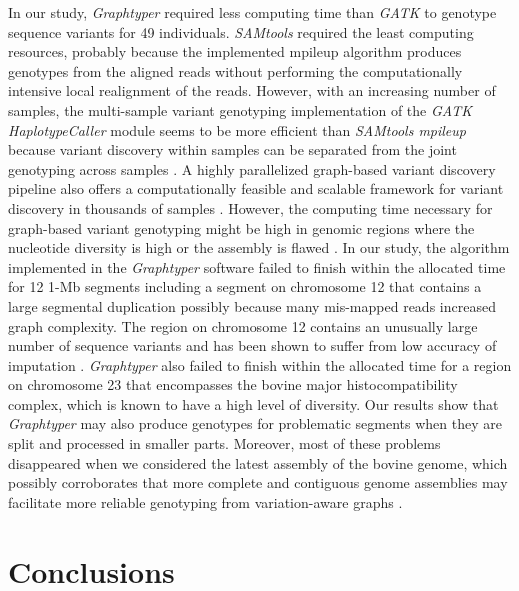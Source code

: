 \documentclass[../main.tex]{subfiles}
\begin{document}
In our study, \emph{Graphtyper} required less computing time than \emph{GATK} to genotype sequence variants for 49 individuals. \emph{SAMtools} required the least computing resources, probably because the implemented mpileup algorithm produces genotypes from the aligned reads without performing the computationally intensive local realignment of the reads. However, with an increasing number of samples, the multi-sample variant genotyping implementation of the \emph{GATK HaplotypeCaller} module seems to be more efficient than \emph{SAMtools mpileup} because variant discovery within samples can be separated from the joint genotyping across samples \citep{poplin2018scaling,vander2018best}. A highly parallelized graph-based variant discovery pipeline also offers a computationally feasible and scalable framework for variant discovery in thousands of samples \citep{eggertsson2017graphtyper}. However, the computing time necessary for graph-based variant genotyping might be high in genomic regions where the nucleotide diversity is high or the assembly is flawed \citep{sibbesen2018accurate,koren2013reducing}. In our study, the algorithm implemented in the \emph{Graphtyper} software failed to finish within the allocated time for 12 1-Mb segments including a segment on chromosome 12 that contains a large segmental duplication \citep{pausch2017evaluation,liu2009analysis,bickhart2012copy} possibly because many mis-mapped reads increased graph complexity. The region on chromosome 12 contains an unusually large number of sequence variants and has been shown to suffer from low accuracy of imputation \citep{pausch2017evaluation}. \emph{Graphtyper} also failed to finish within the allocated time for a region on chromosome 23 that encompasses the bovine major histocompatibility complex, which is known to have a high level of diversity. Our results show that \emph{Graphtyper} may also produce genotypes for problematic segments when they are split and processed in smaller parts. Moreover, most of these problems disappeared when we considered the latest assembly of the bovine genome, which possibly corroborates that more complete and contiguous genome assemblies may facilitate more reliable genotyping from variation-aware graphs \citep{li2014toward,guo2017improvements}.

\section{Conclusions}
\end{document}
